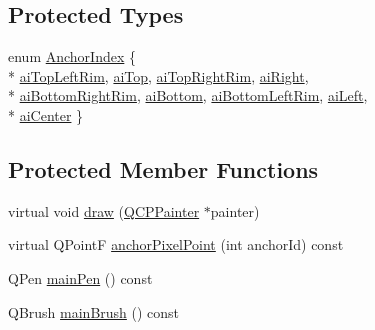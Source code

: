 \subsection*{Protected Types}
\begin{DoxyCompactItemize}
\item 
enum \hyperlink{classQCPItemEllipse_a415009889543169f35b70795f415e45e}{Anchor\+Index} \{ \\*
\hyperlink{classQCPItemEllipse_a415009889543169f35b70795f415e45eab2538849b88921e7fc1dcc15b2a6109d}{ai\+Top\+Left\+Rim}, 
\hyperlink{classQCPItemEllipse_a415009889543169f35b70795f415e45ea83e55b0c1799baac1eecab52bcbe096d}{ai\+Top}, 
\hyperlink{classQCPItemEllipse_a415009889543169f35b70795f415e45ea415d82233c14f0c70c245d50e706e75b}{ai\+Top\+Right\+Rim}, 
\hyperlink{classQCPItemEllipse_a415009889543169f35b70795f415e45ea0f0dcfdf87d9405b53b2129740fb6ba6}{ai\+Right}, 
\\*
\hyperlink{classQCPItemEllipse_a415009889543169f35b70795f415e45eab62732e96d67801d50c6a9bdebc374d0}{ai\+Bottom\+Right\+Rim}, 
\hyperlink{classQCPItemEllipse_a415009889543169f35b70795f415e45ea5894287dedaeec1f48394fd950ccff5b}{ai\+Bottom}, 
\hyperlink{classQCPItemEllipse_a415009889543169f35b70795f415e45ea7b8101bfc590af8ce32961f6545c4f90}{ai\+Bottom\+Left\+Rim}, 
\hyperlink{classQCPItemEllipse_a415009889543169f35b70795f415e45eae74dad00419a0e1f42877510158fb922}{ai\+Left}, 
\\*
\hyperlink{classQCPItemEllipse_a415009889543169f35b70795f415e45ea580ec0e9b9fd1488fccf5783e52c0c02}{ai\+Center}
 \}
\end{DoxyCompactItemize}
\subsection*{Protected Member Functions}
\begin{DoxyCompactItemize}
\item 
virtual void \hyperlink{classQCPItemEllipse_afe97ec827adb05f000fe007783faae3c}{draw} (\hyperlink{classQCPPainter}{Q\+C\+P\+Painter} $\ast$painter)
\item 
virtual Q\+PointF \hyperlink{classQCPItemEllipse_ad3c607304dba081e2f778b6a81b903bb}{anchor\+Pixel\+Point} (int anchor\+Id) const 
\item 
Q\+Pen \hyperlink{classQCPItemEllipse_afc78d49ed5ffa886bccf18f297f83d30}{main\+Pen} () const 
\item 
Q\+Brush \hyperlink{classQCPItemEllipse_a2a9757204877c9d0fd07adfb26d6b1d8}{main\+Brush} () const 
\end{DoxyCompactItemize}
